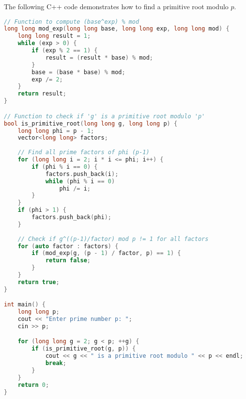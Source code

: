 \documentclass[10pt,a4paper]{article}
\begin{document}
The following C++ code demonstrates how to find a primitive root modulo \(p\).

\begin{lstlisting}[language=C++]
// Function to compute (base^exp) % mod
long long mod_exp(long long base, long long exp, long long mod) {
    long long result = 1;
    while (exp > 0) {
        if (exp % 2 == 1) {
            result = (result * base) % mod;
        }
        base = (base * base) % mod;
        exp /= 2;
    }
    return result;
}

// Function to check if 'g' is a primitive root modulo 'p'
bool is_primitive_root(long long g, long long p) {
    long long phi = p - 1;
    vector<long long> factors;
    
    // Find all prime factors of phi (p-1)
    for (long long i = 2; i * i <= phi; i++) {
        if (phi % i == 0) {
            factors.push_back(i);
            while (phi % i == 0)
                phi /= i;
        }
    }
    if (phi > 1) {
        factors.push_back(phi);
    }
    
    // Check if g^((p-1)/factor) mod p != 1 for all factors
    for (auto factor : factors) {
        if (mod_exp(g, (p - 1) / factor, p) == 1) {
            return false;
        }
    }
    return true;
}

int main() {
    long long p;
    cout << "Enter prime number p: ";
    cin >> p;

    for (long long g = 2; g < p; ++g) {
        if (is_primitive_root(g, p)) {
            cout << g << " is a primitive root modulo " << p << endl;
            break;
        }
    }
    return 0;
}
\end{lstlisting}
\end{document}
